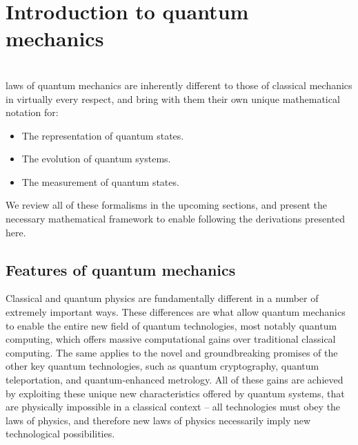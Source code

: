 %
%

\section{Introduction to quantum mechanics}\label{sec:intro_to_QM}

\\

 laws of quantum mechanics are inherently different to those of classical mechanics in virtually every respect, and bring with them their own unique mathematical notation for:
\begin{itemize}
	\item The representation of quantum states.
	\item The evolution of quantum systems.
	\item The measurement of quantum states.
\end{itemize}
We review all of these formalisms in the upcoming sections, and present the necessary mathematical framework to enable following the derivations presented here.

%
%

\subsection{Features of quantum mechanics}

Classical and quantum physics are fundamentally different in a number of extremely important ways. These differences are what allow quantum mechanics to enable the entire new field of quantum technologies, most notably quantum computing, which offers massive computational gains over traditional classical computing. The same applies to the novel and groundbreaking promises of the other key quantum technologies, such as quantum cryptography, quantum teleportation, and quantum-enhanced metrology. All of these gains are achieved by exploiting these unique new characteristics offered by quantum systems, that are physically impossible in a classical context -- all technologies must obey the laws of physics, and therefore new laws of physics necessarily imply new technological possibilities.

